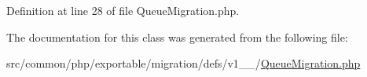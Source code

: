 Definition at line 28 of file Queue\+Migration.\+php.



The documentation for this class was generated from the following file\+:\begin{DoxyCompactItemize}
\item 
src/common/php/exportable/migration/defs/v1\+\_\+\_/\hyperlink{v1__1__0_2QueueMigration_8php}{Queue\+Migration.\+php}\end{DoxyCompactItemize}
